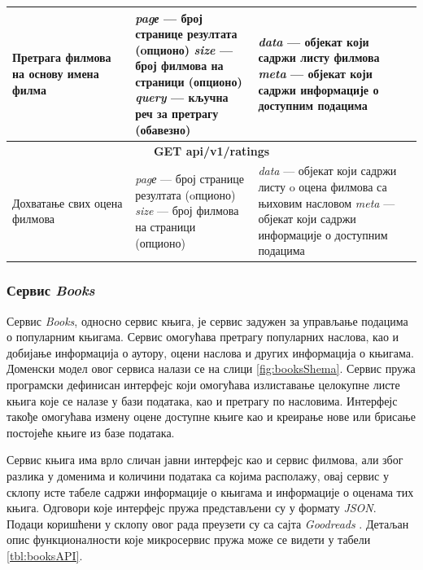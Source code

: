 \documentclass[12pt,oneside]{memoir}
\begin{document}
\begin{table}
\begin{center}
\begin{tabular}{ |  p{0.3\linewidth} | p{0.3\linewidth}|  p{0.4\linewidth} | }
  \hline
  Претрага филмова на основу имена филма
  & 
  \textit{pagе} --- број странице резултата (oпционо) \newline 
  \textit{size} --- број филмова на страници (опционо) \newline 
  \textit{query} --- кључна реч за претрагу (обавезно)
  & 
  \textit{data} --- објекат који садржи листу филмова \newline  
  \textit{meta} --- објекат који садржи информације о доступним подацима\\
   \hline
     \multicolumn{3}{|c|}{\textbf{GET api/v1/ratings}} \\
  \hline
 Дохватање свих оцена филмова
  & 
  \textit{pagе} --- број странице резултата (oпционо) \newline 
  \textit{size} --- број филмова на страници (опционо)
  & 
  \textit{data} --- објекат који садржи листу o оцена филмова са њиховим насловом \newline 
  \textit{meta} --- објекат који садржи информације о доступним подацима \\ 
  \hline
\end{tabular}
\end{center}
\end{table}

\newpage

\subsubsection{Сервис \textit{Books}}

Сервис \textit{Books}, односно сервис књига, је сервис задужен за управљање подацима о популарним књигама. Сервис омогућава претрагу популарних наслова, као и добијање информација о аутору, оцени наслова и других информација о књигама. Доменски модел овог сервиса налази се на слици \ref{fig:booksShema}.
Сервис пружа програмски дефинисан интерфејс који омогућава излиставање целокупне листе књига које се налазе у бази података, као и претрагу по насловима. Интерфејс такође омогућава измену оцене доступне књиге као и креирање нове или брисање постојеће књиге из базе података. 

Сервис књига има врло сличан јавни интерфејс као и сервис филмова, али због разлика у доменима и количини података са којима располажу, овај сервис у склопу исте табеле садржи информације о књигама и информације о оценама тих књига. Одговори које интерфејс пружа представљени су у формату \textit{JSON}. Подаци коришћени у склопу овог рада преузети су са сајта \textit{Goodreads} \cite{goodreads}. Детаљан опис функционалности које микросервис пружа може се видети у табели \ref{tbl:booksAPI}.
\end{document}
